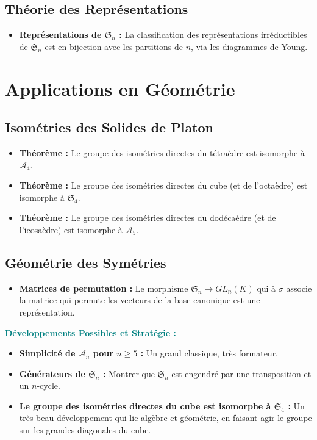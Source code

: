 \documentclass[12pt, a4paper, parskip=full]{report}
\theoremstyle{agregstyle}
\newenvironment{developpements}
  {\par\medskip\noindent\begin{oframed}\noindent\textbf{\textcolor{teal}{Développements Possibles et Stratégie :}}}
  {\end{oframed}\par\medskip}
\begin{document}
\subsection{Théorie des Représentations}
\begin{itemize}
    \item \textbf{Représentations de $\mathfrak{S}_n$ :} La classification des représentations irréductibles de $\mathfrak{S}_n$ est en bijection avec les partitions de $n$, via les diagrammes de Young.
\end{itemize}

\section{Applications en Géométrie}
\subsection{Isométries des Solides de Platon}
\begin{itemize}
    \item \textbf{Théorème :} Le groupe des isométries directes du tétraèdre est isomorphe à $\mathcal{A}_4$.
    \item \textbf{Théorème :} Le groupe des isométries directes du cube (et de l'octaèdre) est isomorphe à $\mathfrak{S}_4$.
    \item \textbf{Théorème :} Le groupe des isométries directes du dodécaèdre (et de l'icosaèdre) est isomorphe à $\mathcal{A}_5$.
\end{itemize}
\subsection{Géométrie des Symétries}
\begin{itemize}
    \item \textbf{Matrices de permutation :} Le morphisme $\mathfrak{S}_n \to GL_n(K)$ qui à $\sigma$ associe la matrice qui permute les vecteurs de la base canonique est une représentation.
\end{itemize}

\begin{developpements}
    \begin{itemize}
        \item \textbf{Simplicité de $\mathcal{A}_n$ pour $n \ge 5$ :} Un grand classique, très formateur.
        \item \textbf{Générateurs de $\mathfrak{S}_n$ :} Montrer que $\mathfrak{S}_n$ est engendré par une transposition et un $n$-cycle.
        \item \textbf{Le groupe des isométries directes du cube est isomorphe à $\mathfrak{S}_4$ :} Un très beau développement qui lie algèbre et géométrie, en faisant agir le groupe sur les grandes diagonales du cube.
    \end{itemize}
\end{developpements}
\end{document}

